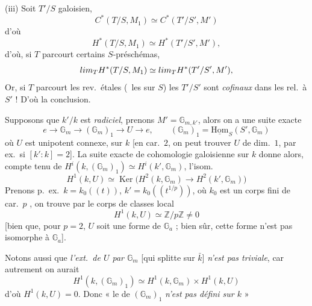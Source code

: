 \documentclass[11pt,a4paper]{article}
\begin{document}
(iii) Soit $T'/S$  galoisien, 
\[
  C^{*}(T/S, M_1) \simeq C^{*}(T'/S', M')
\]
d'où
\[
  H^{*}(T/S, M_1) \simeq H^{*}(T'/S', M') ,
\]
d'où, si $T$ parcourt certains $S$-préschémas,
\[
  \varinjlim_{T} H^{*}(T/S, M_1) \simeq \varinjlim_{T} H^{*}(T'/S', M') ,
\]
Or, si $T$ parcourt les rev.\ étales (\ les  sur $S$) les $T'/S'$ sont \emph{cofinaux} dans
les  \struck{\ill{}}  rel.\ à $S'$ ! D'où la
conclusion.


Supposons que $k'/k$ est \emph{radiciel}, prenons $M' = \mathbb{G}_{m,k'}$,
alors on a une suite exacte
\[
  e \to \mathbb{G}_m \to (\mathbb{G}_m)_1 \to U \to e ,
  \qquad (\mathbb{G}_m)_1 = \underline{\mathrm{Hom}}_S(S', \mathbb{G}_m)
\]
où $U$ est unipotent connexe,  sur $k$ [en car.\ $2$, on peut
trouver $U$ de dim.\ $1$, \struck{\ill{}} par ex.\ si $[k':k] = 2$]. La suite
exacte de cohomologie galoisienne sur $k$ donne alors, compte tenu de
$H^i(k, (\mathbb{G}_m)_1) \simeq H^i(k', \mathbb{G}_m)$, l'isom.
\[
  H^1(k, U) \simeq \operatorname{Ker}\bigl(H^2(k, \mathbb{G}_m) \to
  H^2(k', \mathbb{G}_m)\bigr)
\]
Prenons p.\ ex.\ $k = k_0((t))$, $k' = k_0((t^{1/p}))$, où $k_0$ est un corps
fini de car.\ $p$ , on trouve par le corps
de classes local
\[
  H^1(k, U) \simeq \mathbb{Z}/p\mathbb{Z} \neq 0
\]
[bien que, pour $p = 2$, $U$ soit une forme de $\mathbb{G}_a$ ; bien sûr,
cette forme n'est pas isomorphe à $\mathbb{G}_a$].

Notons aussi que \emph{l'ext.\ de $U$ par $\mathbb{G}_m$} [qui splitte sur
$\bar{k}$] \emph{n'est pas triviale}, car autrement on aurait
\[
  H^1(k, (\mathbb{G}_m)_1) \simeq H^1(k, \mathbb{G}_m) \times H^1(k, U)
\]
d'où $H^1(k, U) = 0$.
Donc « le   de $(\mathbb{G}_m)_1$
\emph{n'est pas défini sur $k$} »

\end{document}
